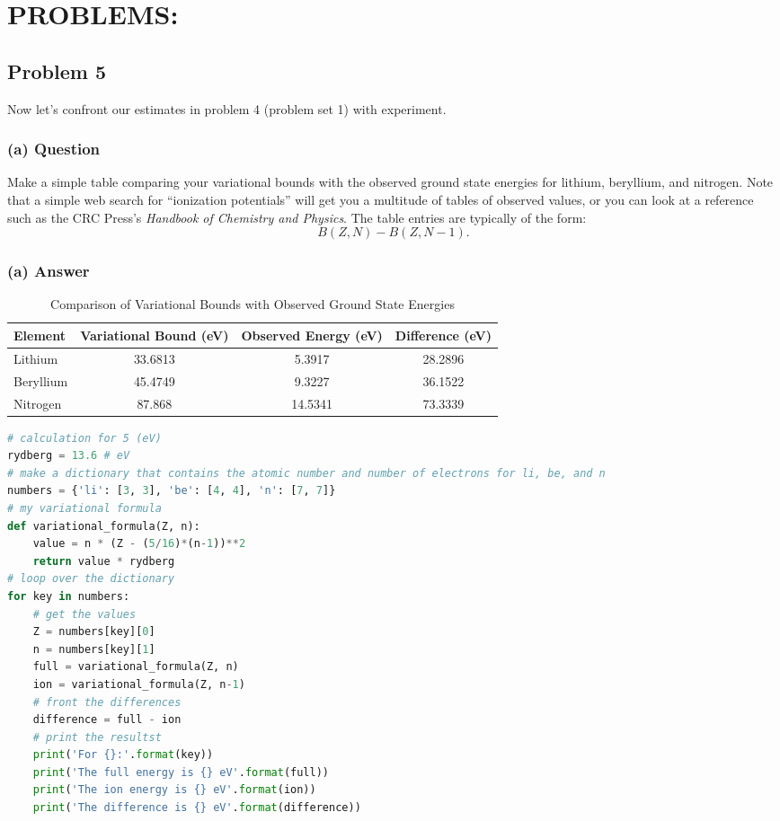 \documentclass{article}
\begin{document}
\section*{PROBLEMS:}

\subsection*{Problem 5}
Now let's confront our estimates in problem 4 (problem set 1) with experiment.

\subsubsection*{(a) Question}
Make a simple table comparing your variational bounds with the observed ground state energies for lithium, beryllium, and nitrogen. Note that a simple web search for ``ionization potentials'' will get you a multitude of tables of observed values, or you can look at a reference such as the CRC Press's \textit{Handbook of Chemistry and Physics}. The table entries are typically of the form:
\begin{equation*}
    B(Z, N) - B(Z, N - 1).
\end{equation*}

\subsubsection*{(a) Answer}
\begin{table}[h!]
\centering
\begin{tabular}{lccc}
\toprule
Element & Variational Bound (eV) & Observed Energy (eV) & Difference (eV) \\
\midrule
Lithium    & 33.6813 & 5.3917 & 28.2896 \\
Beryllium  & 45.4749 & 9.3227 & 36.1522 \\
Nitrogen   & 87.868 & 14.5341 & 73.3339 \\
\bottomrule
\end{tabular}
\caption{Comparison of Variational Bounds with Observed Ground State Energies}
\label{tab:comparison}
\end{table}

\begin{lstlisting}[language=Python]
# calculation for 5 (eV)
rydberg = 13.6 # eV
# make a dictionary that contains the atomic number and number of electrons for li, be, and n
numbers = {'li': [3, 3], 'be': [4, 4], 'n': [7, 7]}
# my variational formula
def variational_formula(Z, n):
    value = n * (Z - (5/16)*(n-1))**2
    return value * rydberg
# loop over the dictionary
for key in numbers:
    # get the values
    Z = numbers[key][0]
    n = numbers[key][1]
    full = variational_formula(Z, n)
    ion = variational_formula(Z, n-1)
    # front the differences
    difference = full - ion
    # print the resultst
    print('For {}:'.format(key))
    print('The full energy is {} eV'.format(full))
    print('The ion energy is {} eV'.format(ion))
    print('The difference is {} eV'.format(difference))
\end{lstlisting}
\end{document}
